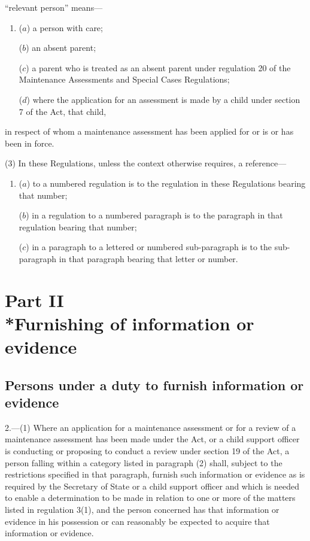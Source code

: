 \documentclass[a4paper]{article}
\newcommand{\parthead}{}
\begin{document}
\begin{enumerate}
“relevant person” means—
\begin{enumerate}\item[]
($a$) a person with care;

($b$) an absent parent;

($c$) a parent who is treated as an absent parent under regulation 20 of the Maintenance Assessments and Special Cases Regulations;

($d$) where the application for an assessment is made by a child under section 7 of the Act, that child,
\end{enumerate}
in respect of whom a maintenance assessment has been applied for or is or has been in force.
\end{enumerate}

(3) In these Regulations, unless the context otherwise requires, a reference—
\begin{enumerate}\item[]
($a$) to a numbered regulation is to the regulation in these Regulations bearing that number;

($b$) in a regulation to a numbered paragraph is to the paragraph in that regulation bearing that number;

($c$) in a paragraph to a lettered or numbered sub-paragraph is to the sub-paragraph in that paragraph bearing that letter or number.
\end{enumerate}

\section[Part II --- Furnishing of information or evidence]{Part II\\*Furnishing of information or evidence}

\renewcommand\parthead{--- Part II}

\subsection[2. Persons under a duty to furnish information or evidence]{Persons under a duty to furnish information or evidence}

2.—(1) Where an application for a maintenance assessment 
or for a review of a maintenance assessment  %
has been made under the Act, 
or a child support officer is conducting or proposing to conduct a review under section 19 of the Act,  %
a person falling within a category listed in paragraph (2) shall, subject to the restrictions specified in that paragraph, furnish such information or evidence as is required by the Secretary of State 
or a child support officer  %
and which is needed to enable a determination to be made in relation to one or more of the matters listed in regulation 3(1), and the person concerned has that information or evidence in his possession or can reasonably be expected to acquire that information or evidence.
\end{document}

